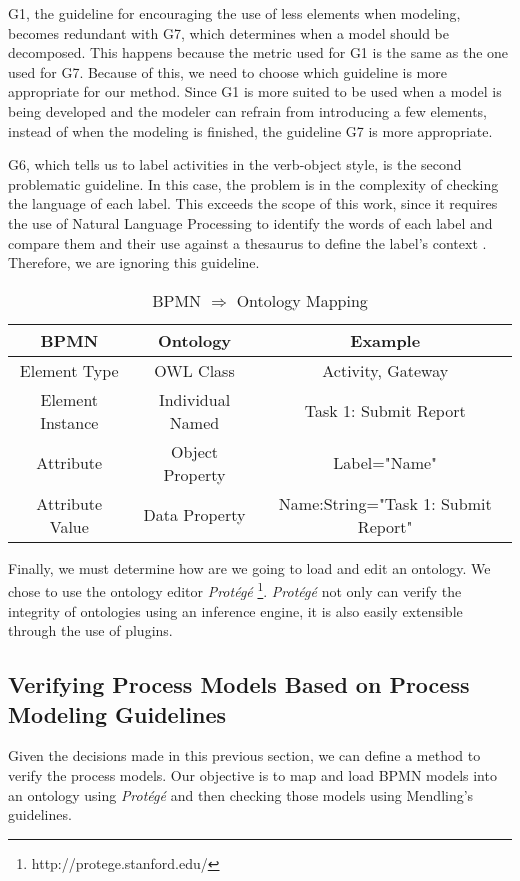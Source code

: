 \documentclass[a4paper,twoside]{article}
\begin{document}
G1, the guideline for encouraging the use of less elements when modeling, becomes redundant with G7, which determines when a model should be decomposed. This happens because the metric used for G1 is the same as the one used for G7. Because of this, we need to choose which guideline is more appropriate for our method. Since G1 is more suited to be used when a model is being developed and the modeler can refrain from introducing a few elements, instead of when the modeling is finished, the guideline G7 is more appropriate.

G6, which tells us to label activities in the verb-object style, is the second problematic guideline. In this case, the problem is in the complexity of checking the language of each label. This exceeds the scope of this work, since it requires the use of Natural Language Processing to identify the words of each label and compare them and their use against a thesaurus to define the label's context \cite{gassen2014business}. Therefore, we are ignoring this guideline.

\begin{table*}[]
	\caption{BPMN $\Rightarrow$ Ontology Mapping}
	\label{bpmnOntologyMapping}
	\centering
	\begin{tabular}{| c |c |c |}
		\hline
		BPMN & Ontology & Example \\
		\hline
		Element Type & OWL Class & Activity, Gateway \\\hline
		Element Instance & Individual Named & Task 1: Submit Report \\  \hline
		Attribute & Object Property & Label="Name" \\\hline
		Attribute Value & Data Property & Name:String="Task 1: Submit Report" \\ 
		\hline
	\end{tabular} 
\end{table*}


Finally, we must determine how are we going to load and edit an ontology. We chose to use the ontology editor \textit{Protégé} \footnote{http://protege.stanford.edu/}. \textit{Protégé} not only can verify the integrity of ontologies using an inference engine, it is also easily extensible through the use of plugins. %

\subsection{Verifying Process Models Based on Process Modeling Guidelines}
\noindent Given the decisions made in this previous section, we can define a method to verify the process models. Our objective is to map and load BPMN models into an ontology using \textit{Protégé} and then checking those models using Mendling's guidelines.
\end{document}

